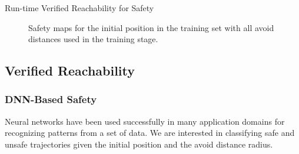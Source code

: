 \begin{section}{Run-time Verified Reachability for Safety}
\begin{figure}[H]
	\centering
	\caption{Safety maps for the initial position in the training set with all avoid distances used in the training stage.}
	\label{fig:safety_gt}
\end{figure}

\subsection{Verified Reachability}
\subsubsection{DNN-Based Safety}
Neural networks have been used successfully in many application domains for recognizing patterns from a set of data. We are interested in classifying safe and unsafe trajectories given the initial position and the avoid distance radius.


\end{section}
